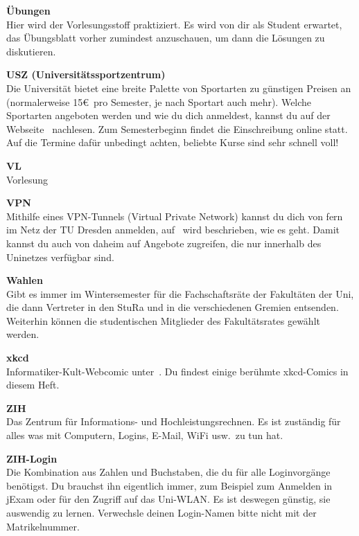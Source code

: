 \begin{multicols}{2}
\textbf{Übungen} \\
Hier wird der Vorlesungsstoff praktiziert.
Es wird von dir als Student erwartet, das Übungsblatt vorher zumindest anzuschauen, um dann die Lösungen zu diskutieren.

\textbf{USZ (Universitätssportzentrum)} \\
Die Universität bietet eine breite Palette von Sportarten zu günstigen Preisen an (normalerweise 15\euro\ pro Semester, je nach Sportart auch mehr).
Welche Sportarten angeboten werden und wie du dich anmeldest, kannst du auf der Webseite~ nachlesen.
Zum Semesterbeginn findet die Einschreibung online statt.
Auf die Termine dafür unbedingt achten, beliebte Kurse sind sehr schnell voll!

\textbf{VL} \\
Vorlesung

\vfill\columnbreak%

\textbf{VPN}\\
Mithilfe eines VPN-Tunnels (Virtual Private Network) kannst du dich von fern im Netz der TU Dresden anmelden, auf~ wird beschrieben, wie es geht.
Damit kannst du auch von daheim auf Angebote zugreifen, die nur innerhalb des Uninetzes verfügbar sind.

\textbf{Wahlen} \\
Gibt es immer im Wintersemester für die Fachschaftsräte der Fakultäten der Uni, die dann Vertreter in den StuRa und in die verschiedenen Gremien entsenden.
Weiterhin können die studentischen Mitglieder des Fakultätsrates gewählt werden.

\textbf{xkcd} \\
Informatiker-Kult-Webcomic unter~. Du findest einige berühmte xkcd-Comics in diesem Heft.

\textbf{ZIH} \\
Das Zentrum für Informations- und Hochleistungsrechnen.
Es ist zuständig für alles was mit Computern, Logins, E-Mail, WiFi usw.\ zu tun hat.

\textbf{ZIH-Login} \\
Die Kombination aus Zahlen und Buchstaben, die du für alle Loginvorgänge
benötigst. Du brauchst ihn eigentlich immer, zum Beispiel zum Anmelden in jExam
oder für den Zugriff auf das Uni-WLAN\@. Es ist deswegen günstig, sie auswendig
zu lernen. Verwechsle deinen Login-Namen bitte nicht mit der Matrikelnummer.

\end{multicols}

